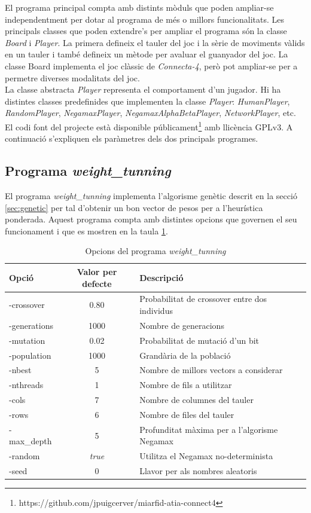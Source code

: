 \documentclass[12pt,a4paper]{article}
\begin{document}
El programa principal compta amb distints mòduls que poden ampliar-se independentment per dotar al programa de més o millors funcionalitats. Les principals classes que poden extendre's per ampliar el programa són la classe \emph{Board} i \emph{Player}. La primera defineix el tauler del joc i la sèrie de moviments vàlids en un tauler i també defineix un mètode per avaluar el guanyador del joc. La classe Board implementa el joc clàssic de \emph{Connecta-4}, però pot ampliar-se per a permetre diverses modalitats del joc.\\

La classe  abstracta \emph{Player} representa el comportament d'un jugador. Hi ha distintes classes predefinides que implementen la classe \emph{Player}: \emph{HumanPlayer}, \emph{RandomPlayer}, \emph{NegamaxPlayer}, \emph{NegamaxAlphaBetaPlayer}, \emph{NetworkPlayer}, etc.\\

El codi font del projecte està disponible públicament\footnote{https://github.com/jpuigcerver/miarfid-atia-connect4} amb llicència GPLv3. A continuació s'expliquen els paràmetres dels dos principals programes.\\

\subsection{Programa \emph{weight\_tunning}}
El programa \emph{weight\_tunning} implementa l'algorisme genètic descrit en la secció \ref{sec:genetic} per tal d'obtenir un bon vector de pesos per a l'heurística ponderada. Aquest programa compta amb distintes opcions que governen el seu funcionament i que es mostren en la taula \ref{tab:weight_tunning_opts}.\\

\begin{table}[h]
\centering
\begin{tabular}{|l|c|l|}
\hline 
Opció & Valor per defecte & Descripció\\
\hline 
-crossover & 0.80 & Probabilitat de crossover entre dos individus\\
-generations & 1000 & Nombre de generacions\\
-mutation & 0.02 & Probabilitat de mutació d'un bit\\
-population & 1000 & Grandària de la població\\
-nbest & 5 & Nombre de millors vectors a considerar\\
-nthreads & 1 & Nombre de fils a utilitzar \\
-cols & 7 & Nombre de columnes del tauler\\
-rows & 6 & Nombre de files del tauler\\
-max\_depth & 5 & Profunditat màxima per a l'algorisme Negamax\\
-random & \emph{true} & Utilitza el Negamax no-determinista\\
-seed & 0 & Llavor per als nombres aleatoris\\
\hline
\end{tabular}
\caption{Opcions del programa \emph{weight\_tunning}}
\label{tab:weight_tunning_opts}
\end{table}
\end{document}
